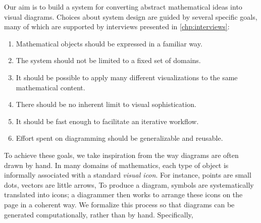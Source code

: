 Our aim is to build a system for converting abstract mathematical ideas into visual diagrams.  Choices about system design are guided by several specific goals, many of which are supported by interviews presented in \cref{chp:interviews}:
\begin{enumerate}
   \item Mathematical objects should be expressed in a familiar way.\label{gol:FamiliarNotation} %
   \item The system should not be limited to a fixed set of domains.\label{gol:NoFixedDomains} %
   \item It should be possible to apply many different visualizations to the same mathematical content.\label{gol:ManyViz} %
   \item There should be no inherent limit to visual sophistication.\label{gol:sophistication}  %
   \item It should be fast enough to facilitate an iterative workflow.\label{gol:FastEnough}  %
   \item Effort spent on diagramming should be generalizable and reusable.\label{gol:Reuse}
\end{enumerate}

To achieve these goals, we take inspiration from the way diagrams are often drawn by hand.  In many domains of mathematics, each type of object is informally associated with a standard \emph{visual icon}.  For instance, points are small dots, vectors are little arrows, \etc{}  To produce a diagram, symbols are systematically translated into icons; a diagrammer then works to arrange these icons on the page in a coherent way.  We formalize this process so that diagrams can be generated computationally, rather than by hand.  Specifically,

